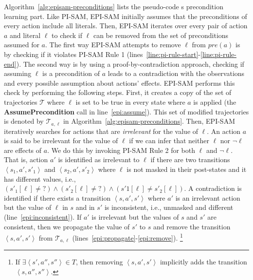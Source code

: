 \documentclass[letterpaper]{article} %
\newcommand{\tuple}[1]{\ensuremath{\left \langle #1 \right \rangle }}
\newcommand{\pre}{\textit{pre}}
\newcommand{\unobserved}{\textit{?}}
\begin{document}
Algorithm~\ref{alg:episam-preconditions} lists the pseudo-code s precondition learning part.
Like PI-SAM, EPI-SAM initially assumes that the preconditions of every action include all literals.
Then, EPI-SAM iterates over every pair of action $a$ and literal $\ell$ to check if $\ell$ can be removed from the set of preconditions assumed for $a$.
The first way EPI-SAM attempts to remove $\ell$ from $\pre(a)$ is by checking if it violates PI-SAM Rule 1 (lines~\ref{line:pi-rule-start}-\ref{line:pi-rule-end}).
The second way is by using a proof-by-contradiction approach, checking if assuming $\ell$ is a precondition of $a$ leads to a contradiction with the observations and every possible assumption about actions' effects.
EPI-SAM performs this check by performing the following steps.
First, it creates a copy of the set of trajectories $\mathcal{T}$ where
$\ell$ is set to be true in every state where $a$ is applied (the \textbf{AssumePrecondition} call in line~\ref{epi:assume}).
This set of modified trajectories is denoted by $\mathcal{T}_{a,\ell}$ in Algorithm~\ref{alg:episam-preconditions}.
Then, EPI-SAM iteratively searches for actions that are \emph{irrelevant} for the value of $\ell$.
An action $a$ is said to be irrelevant for the value of $\ell$ if we can infer that neither $\ell$ nor $\neg \ell$ are effects of $a$. We do this by invoking PI-SAM Rule 2 for both $\ell$ and $\neg\ell$.
That is, action $a'$ is identified as irrelevant to $\ell$ if there are two transitions $\tuple{s_1, a', s'_1}$ and $\tuple{s_2, a', s'_2}$ where $\ell$ is not masked in their post-states and it has different values, i.e.,
$(s'_1[\ell]\neq \unobserved) \wedge (s'_2[\ell]\neq\unobserved) \wedge (s'1[\ell]\neq s'_2[\ell])$.
A contradiction is identified if there exists a transition $\tuple{s,a',s'}$ where $a'$ is an irrelevant action but the value of $\ell$ in $s$ and in $s'$ is inconsistent, i.e., unmasked and different (line~\ref{epi:inconsistent}).
If $a'$ is irrelevant but the values of $s$ and $s'$ are consistent, then we propagate the value of $s'$ to $s$ and remove the transition $\tuple{s,a',s'}$ from $\mathcal{T}_{a,\ell}$ (lines~\ref{epi:propagate}-\ref{epi:remove}).
\footnote{If $\exists\tuple{s',a'',s''}\in T$, then removing $\tuple{s,a',s'}$ implicitly adds the transition $\tuple{s,a'',s''}$.}
\end{document}
